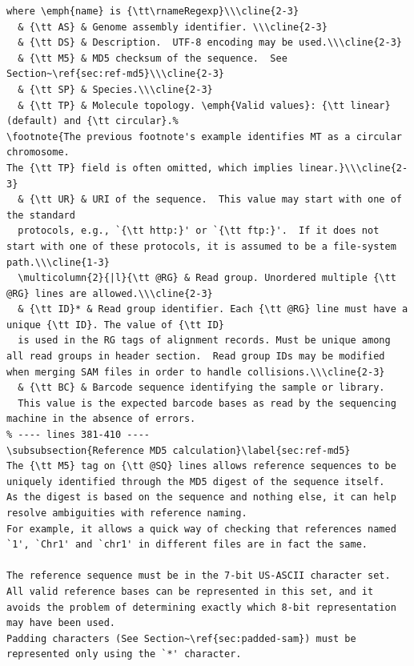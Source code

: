 \begin{verbatim}
where \emph{name} is {\tt\rnameRegexp}\\\cline{2-3}
  & {\tt AS} & Genome assembly identifier. \\\cline{2-3}
  & {\tt DS} & Description.  UTF-8 encoding may be used.\\\cline{2-3}
  & {\tt M5} & MD5 checksum of the sequence.  See Section~\ref{sec:ref-md5}\\\cline{2-3}
  & {\tt SP} & Species.\\\cline{2-3}
  & {\tt TP} & Molecule topology. \emph{Valid values}: {\tt linear} (default) and {\tt circular}.%
\footnote{The previous footnote's example identifies MT as a circular chromosome.
The {\tt TP} field is often omitted, which implies linear.}\\\cline{2-3}
  & {\tt UR} & URI of the sequence.  This value may start with one of the standard
  protocols, e.g., `{\tt http:}' or `{\tt ftp:}'.  If it does not start with one of these protocols, it is assumed to be a file-system path.\\\cline{1-3}
  \multicolumn{2}{|l}{\tt @RG} & Read group. Unordered multiple {\tt @RG} lines are allowed.\\\cline{2-3}
  & {\tt ID}* & Read group identifier. Each {\tt @RG} line must have a unique {\tt ID}. The value of {\tt ID}
  is used in the RG tags of alignment records. Must be unique among all read groups in header section.  Read group IDs may be modified when merging SAM files in order to handle collisions.\\\cline{2-3}
  & {\tt BC} & Barcode sequence identifying the sample or library.
  This value is the expected barcode bases as read by the sequencing machine in the absence of errors.
% ---- lines 381-410 ----
\subsubsection{Reference MD5 calculation}\label{sec:ref-md5}
The {\tt M5} tag on {\tt @SQ} lines allows reference sequences to be uniquely identified through the MD5 digest of the sequence itself.
As the digest is based on the sequence and nothing else, it can help resolve ambiguities with reference naming.
For example, it allows a quick way of checking that references named `1', `Chr1' and `chr1' in different files are in fact the same.

The reference sequence must be in the 7-bit US-ASCII character set.
All valid reference bases can be represented in this set, and it avoids the problem of determining exactly which 8-bit representation may have been used.
Padding characters (See Section~\ref{sec:padded-sam}) must be represented only using the `*' character. 


\end{verbatim}
